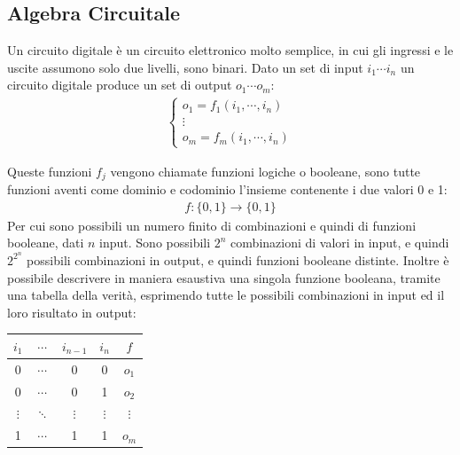 \documentclass{article}
\numberwithin{equation}{subsection}
\begin{document}
\subsection{Algebra Circuitale}

Un circuito digitale è un circuito elettronico molto semplice, in cui gli ingressi e le uscite assumono solo due livelli, sono binari. Dato un set di input $i_1\cdots i_n$ un circuito digitale produce un set di 
output $o_1\cdots o_m$:
\begin{gather*}
    \begin{cases}
        o_1=f_1(i_1,\cdots,i_n)\\
        \vdots\\
        o_m=f_m(i_1,\cdots,i_n)
    \end{cases}
\end{gather*}

Queste funzioni $f_j$ vengono chiamate funzioni logiche o booleane, sono tutte funzioni aventi come dominio e codominio l'insieme contenente i due valori 0 e 1:
\begin{gather*}
    f:\{0,1\}\to\{0,1\}
\end{gather*}
Per cui sono possibili un numero finito di combinazioni e quindi di funzioni booleane, dati $n$ input. Sono possibili $2^n$ combinazioni di valori in input, e quindi $2^{2^n}$ possibili combinazioni in output, e quindi 
funzioni booleane distinte. Inoltre è possibile descrivere in maniera esaustiva una singola funzione booleana, tramite una tabella della verità, esprimendo tutte le possibili combinazioni in input ed il loro 
risultato in output:
\begin{center}
    \begin{tabular}{|c|c|c|c||c|}
        \hline
        $i_1$ &$\cdots$&$i_{n-1}$&$i_n$&$f$\\
        \hline\hline
        0&$\cdots$&0&0&$o_1$\\
        \hline
        0&$\cdots$&0&1&$o_2$\\
        \hline
        $\vdots$&$\ddots$&$\vdots$&$\vdots$&$\vdots$\\
        \hline
        1&$\cdots$&1&1&$o_m$\\
        \hline
    \end{tabular}
\end{center}
\end{document}

